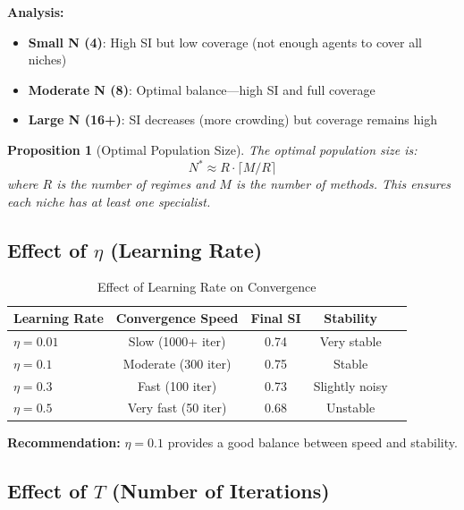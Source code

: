\documentclass[11pt,a4paper]{article}
\theoremstyle{definition}
\theoremstyle{plain}
\newtheorem{proposition}{Proposition}[section]
\begin{document}
\textbf{Analysis:}
\begin{itemize}
    \item \textbf{Small N (4)}: High SI but low coverage (not enough agents to cover all niches)
    \item \textbf{Moderate N (8)}: Optimal balance---high SI and full coverage
    \item \textbf{Large N (16+)}: SI decreases (more crowding) but coverage remains high
\end{itemize}

\begin{proposition}[Optimal Population Size]
The optimal population size is:
\begin{equation}
N^* \approx R \cdot \lceil M / R \rceil
\end{equation}
where $R$ is the number of regimes and $M$ is the number of methods. This ensures each niche has at least one specialist.
\end{proposition}

\subsection{Effect of $\eta$ (Learning Rate)}

\begin{table}[h]
\centering
\caption{Effect of Learning Rate on Convergence}
\begin{tabular}{l|cccc}
\toprule
Learning Rate & Convergence Speed & Final SI & Stability \\
\midrule
$\eta = 0.01$ & Slow (1000+ iter) & 0.74 & Very stable \\
$\eta = 0.1$ & Moderate (300 iter) & 0.75 & Stable \\
$\eta = 0.3$ & Fast (100 iter) & 0.73 & Slightly noisy \\
$\eta = 0.5$ & Very fast (50 iter) & 0.68 & Unstable \\
\bottomrule
\end{tabular}
\end{table}

\textbf{Recommendation:} $\eta = 0.1$ provides a good balance between speed and stability.

\subsection{Effect of $T$ (Number of Iterations)}
\end{document}
